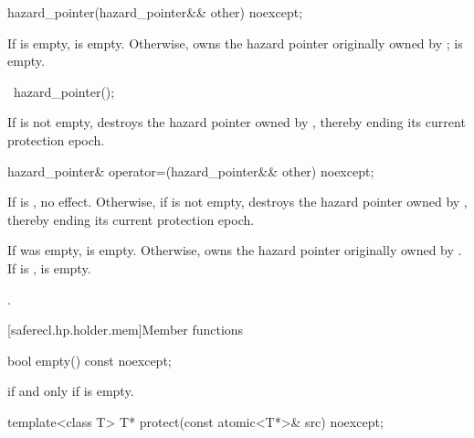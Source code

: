 %
\begin{itemdecl}
hazard_pointer(hazard_pointer&& other) noexcept;
\end{itemdecl}

\begin{itemdescr}
\pnum
\ensures
If  is empty,  is empty.
Otherwise,
 owns the hazard pointer originally owned by ;
 is empty.
\end{itemdescr}

%
\begin{itemdecl}
~hazard_pointer();
\end{itemdecl}

\begin{itemdescr}
\pnum
\effects
If  is not empty,
destroys the hazard pointer owned by ,
thereby ending its current protection epoch.
\end{itemdescr}

%
\begin{itemdecl}
hazard_pointer& operator=(hazard_pointer&& other) noexcept;
\end{itemdecl}

\begin{itemdescr}
\pnum
\effects
If  is , no effect.
Otherwise, if  is not empty,
destroys the hazard pointer owned by ,
thereby ending its current protection epoch.

\pnum
\ensures
If  was empty,  is empty.
Otherwise,  owns the hazard pointer originally
owned by .
If  is ,  is empty.

\pnum
\returns
{}.
\end{itemdescr}

[saferecl.hp.holder.mem]{Member functions}

%
\begin{itemdecl}
bool empty() const noexcept;
\end{itemdecl}

\begin{itemdescr}
\pnum
\returns
{} if and only if  is empty.
\end{itemdescr}

%
\begin{itemdecl}
template<class T> T* protect(const atomic<T*>& src) noexcept;
\end{itemdecl}

